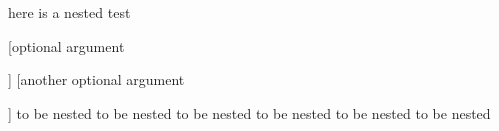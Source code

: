 here is a nested test
\begin{one}

	[optional argument

	]
	[another optional argument


	]
	to be nested to be nested
	to be nested to be nested
	to be nested to be nested
\end{one}
